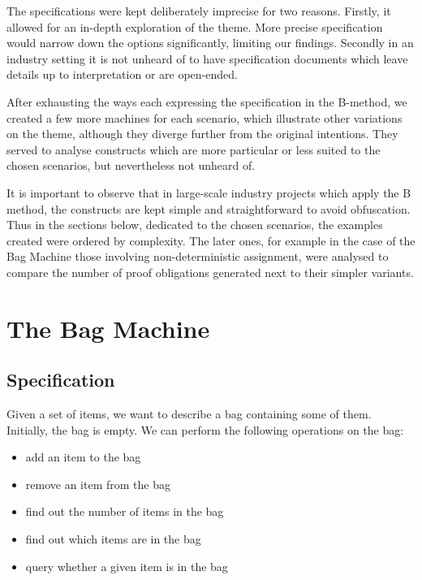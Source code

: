 \documentclass[12pt,journal,duplex]{IEEEtran}
\begin{document}
	The specifications were kept deliberately imprecise for two reasons. Firstly, it allowed for an in-depth exploration of the theme. More precise specification would narrow down the options significantly, limiting our findings. Secondly in an industry setting it is not unheard of to have specification documents which leave details up to interpretation or are open-ended.

	After exhausting the ways each expressing the specification in the B-method, we created a few more machines for each scenario, which illustrate other variations on the theme, although they diverge further from the original intentions. They served to analyse constructs which are more particular or less suited to the chosen scenarios, but nevertheless not unheard of.

	It is important to observe that in large-scale industry projects which apply the B method, the constructs are kept simple and straightforward to avoid obfuscation. Thus in the sections below, dedicated to the chosen scenarios, the examples created were ordered by complexity. The later ones, for example in the case of the Bag Machine those involving non-deterministic assignment, were analysed to compare the number of proof obligations generated next to their simpler variants.

	\section{The Bag Machine}
	\subsection{Specification}
	Given a set of items, we want to describe a bag containing some of them. Initially, the bag is empty. We can perform the following operations on the bag:
	\begin{itemize}
		\item add an item to the bag
		\item remove an item from the bag
		\item find out the number of items in the bag
		\item find out which items are in the bag
		\item query whether a given item is in the bag
	\end{itemize}
\end{document}
